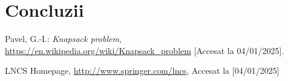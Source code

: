 \documentclass[runningheads]{llncs}
\begin{document}
\section{Concluzii}

%
%
%
% 
% 
%
\begin{thebibliography}{8}
Pavel, G.-I.: \emph{Knapsack problem}, \url{https://en.wikipedia.org/wiki/Knapsack_problem} [Accesat la 04/01/2025].

LNCS Homepage, \url{http://www.springer.com/lncs}, Accesat la [04/01/2025]


\end{thebibliography}
\end{document}
